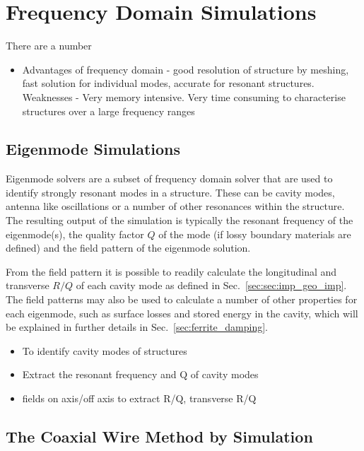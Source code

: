 \section{Frequency Domain Simulations}

There are a number

\begin{itemize}
\item{Advantages of frequency domain - good resolution of structure by meshing, fast solution for individual modes, accurate for resonant structures. Weaknesses - Very memory intensive. Very time consuming to characterise structures over a large frequency ranges}
\end{itemize}

\subsection{Eigenmode Simulations}

Eigenmode solvers are a subset of frequency domain solver that are used to identify strongly resonant modes in a structure. These can be cavity modes, antenna like oscillations or a number of other resonances within the structure. The resulting output of the simulation is typically the resonant frequency of the eigenmode(s), the quality factor $Q$ of the mode (if lossy boundary materials are defined) and the field pattern of the eigenmode solution.

From the field pattern it is possible to readily calculate the longitudinal and transverse $R/Q$ of each cavity mode as defined in Sec.~\ref{sec:sec:imp_geo_imp}. The field patterns may also be used to calculate a number of other properties for each eigenmode, such as surface losses and stored energy in the cavity, which will be explained in further details in Sec.~\ref{sec:ferrite_damping}.

\begin{itemize}
\item{To identify cavity modes of structures}
\item{Extract the resonant frequency and Q of cavity modes}
\item{fields on axis/off axis to extract R/Q, transverse R/Q}
\end{itemize}

\subsection{The Coaxial Wire Method by Simulation}

